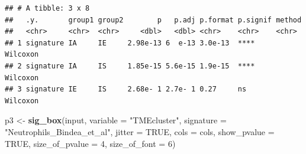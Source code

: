 \documentclass[
  12pt,
]{book}
\newenvironment{Shaded}{\begin{snugshade}}{\end{snugshade}}
\newcommand{\AttributeTok}[1]{\textcolor[rgb]{0.13,0.29,0.53}{#1}}
\newcommand{\ConstantTok}[1]{\textcolor[rgb]{0.56,0.35,0.01}{#1}}
\newcommand{\DecValTok}[1]{\textcolor[rgb]{0.00,0.00,0.81}{#1}}
\newcommand{\FunctionTok}[1]{\textcolor[rgb]{0.13,0.29,0.53}{\textbf{#1}}}
\newcommand{\NormalTok}[1]{#1}
\newcommand{\OtherTok}[1]{\textcolor[rgb]{0.56,0.35,0.01}{#1}}
\newcommand{\SpecialCharTok}[1]{\textcolor[rgb]{0.81,0.36,0.00}{\textbf{#1}}}
\newcommand{\StringTok}[1]{\textcolor[rgb]{0.31,0.60,0.02}{#1}}
\begin{document}
\begin{Shaded}
\end{Shaded}

\begin{verbatim}
## # A tibble: 3 x 8
##   .y.       group1 group2        p   p.adj p.format p.signif method  
##   <chr>     <chr>  <chr>     <dbl>   <dbl> <chr>    <chr>    <chr>   
## 1 signature IA     IE     2.98e-13 6  e-13 3.0e-13  ****     Wilcoxon
## 2 signature IA     IS     1.85e-15 5.6e-15 1.9e-15  ****     Wilcoxon
## 3 signature IE     IS     2.68e- 1 2.7e- 1 0.27     ns       Wilcoxon
\end{verbatim}

\begin{Shaded}
\begin{Highlighting}[]
\NormalTok{p3 }\OtherTok{\textless{}{-}} \FunctionTok{sig\_box}\NormalTok{(input, }\AttributeTok{variable =} \StringTok{"TMEcluster"}\NormalTok{, }\AttributeTok{signature =} \StringTok{"Neutrophils\_Bindea\_et\_al"}\NormalTok{,  }
              \AttributeTok{jitter =} \ConstantTok{TRUE}\NormalTok{, }\AttributeTok{cols =}\NormalTok{  cols, }\AttributeTok{show\_pvalue =} \ConstantTok{TRUE}\NormalTok{, }\AttributeTok{size\_of\_pvalue =} \DecValTok{4}\NormalTok{, }\AttributeTok{size\_of\_font =} \DecValTok{6}\NormalTok{)}
\end{Highlighting}
\end{Shaded}
\end{document}
